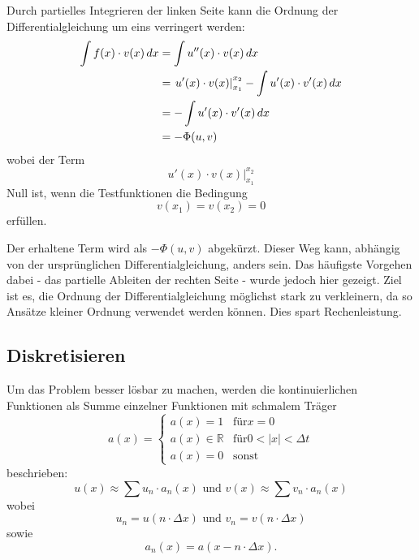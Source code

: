 Durch partielles Integrieren der linken Seite kann die Ordnung der Differentialgleichung um eins verringert werden:
\begin{align}
    \int f(x) \cdot v(x) \, d x &= \int u''(x) \cdot v(x) \, d x \\
                                 &= \left. u'(x) \cdot v(x) \right|_{x_1}^{x_2} - \int u'(x) \cdot v'(x) \, d x \\
                                 &= - \int u'(x) \cdot v'(x) \, d x \\
                                 &= - \Phi(u, v)
\end{align}
wobei der Term
\begin{equation}
    \left. u'(x) \cdot v(x) \right|_{x_1}^{x_2}
\end{equation}
Null ist, wenn die Testfunktionen die Bedingung
\begin{equation}
    v(x_1) = v(x_2) = 0
\end{equation}
erfüllen. %

Der erhaltene Term wird als $-\Phi(u, v)$ abgekürzt.
Dieser Weg kann, abhängig von der ursprünglichen Differentialgleichung, anders sein.
Das häufigste Vorgehen dabei - das partielle Ableiten der rechten Seite - wurde jedoch hier gezeigt.
Ziel ist es, die Ordnung der Differentialgleichung möglichst stark zu verkleinern, da so Ansätze kleiner Ordnung verwendet werden können.
Dies spart Rechenleistung.


\subsection{Diskretisieren\label{fem:1d:diskretisieren}}
Um das Problem besser lösbar zu machen, werden die kontinuierlichen Funktionen als Summe einzelner Funktionen mit schmalem Träger 
\begin{equation}
    a(x) = \left\{ \begin{array} {ll}
        a(x) = 1            & \mbox{für} x = 0 \\
        a(x) \in \mathbb{R} & \mbox{für} 0 < |x| < \Delta t \\
        a(x) = 0            & \mbox{sonst} 
    \end{array}\right.
\end{equation}
beschrieben:
\begin{equation}
    u(x) \approx \sum{u_n \cdot a_n(x)} \mbox{ und } v(x) \approx \sum{v_n \cdot a_n(x)}
\end{equation}
wobei 
\begin{equation}
    u_n = u(n \cdot \Delta x) \mbox{ und } v_n = v(n \cdot \Delta x)
\end{equation}
sowie 
\begin{equation}
    a_n(x) = a(x - n \cdot \Delta x).
\end{equation}

